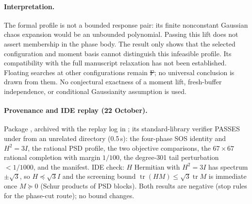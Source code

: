 \paragraph{Interpretation.}
The formal profile is not a bounded response pair: its finite nonconstant
Gaussian chaos expansion would be an unbounded polynomial. Passing this
lift does not assert membership in the phase body. The result only shows
that the selected configuration and moment basis cannot distinguish this
infeasible profile. Its compatibility with the full manuscript relaxation
has not been established. Floating searches at other configurations remain
\st{F}; no universal conclusion is drawn from them. No conjectural
exactness of a moment lift, fresh-buffer independence, or conditional
Gaussianity assumption is used.


\paragraph{Provenance and IDE replay (22 October).} Package , archived with the replay log in
; its standard-library verifier PASSES under  from an unrelated directory (0.5\,s): the four-phase
SOS identity and $H^2=3I$, the rational PSD profile, the two objective comparisons, the $67\times67$ rational completion with margin $1/100$, the
degree-301 tail perturbation $<1/1000$, and the manifest. IDE check: $H$ Hermitian with $H^2=3I$ has spectrum $\pm\sqrt3$, so $H\preceq\sqrt3I$ and the
screening bound $\operatorname{tr}(HM)\le\sqrt3\operatorname{tr}M$ is immediate once $M\succeq0$ (Schur products of PSD blocks). Both results are negative
(stop rules for the phase-cut route); no bound changes.
